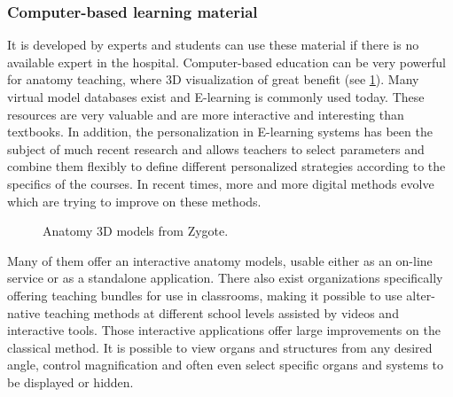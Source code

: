 \subsubsection{Computer-based learning material} 
It is developed by experts and students can use these material if there is no available expert in the hospital. Computer-based education can be very powerful for anatomy teaching, where 3D visualization of great benefit (see \figurename{\ref{fig:2-bg:zygote-body-esplorazione}}). Many virtual model databases exist and E-learning is commonly used today. These resources are very valuable and are more interactive and interesting than textbooks. 
In addition, the personalization in E-learning systems has been the subject of much recent research and allows teachers to select parameters and combine them flexibly to define different personalized strategies according to the specifics of the courses. In recent times, more and more digital methods evolve which are trying to improve on these methods. 
\begin{figure}
\centering
{}
\qquad
{}
\caption{Anatomy 3D models from Zygote.}
\label{fig:2-bg:zygote-body-esplorazione}
\end{figure}
Many of them offer an interactive anatomy models, usable either as an on-line service or as a standalone application. There also exist organizations specifically offering teaching bundles for use in classrooms, making it possible to use alter-native teaching methods at different school levels assisted by videos and interactive tools. Those interactive applications offer large improvements on the classical method. It is possible to view organs and structures from any desired angle, control magnification and often even select specific organs and systems to be displayed or hidden. 
